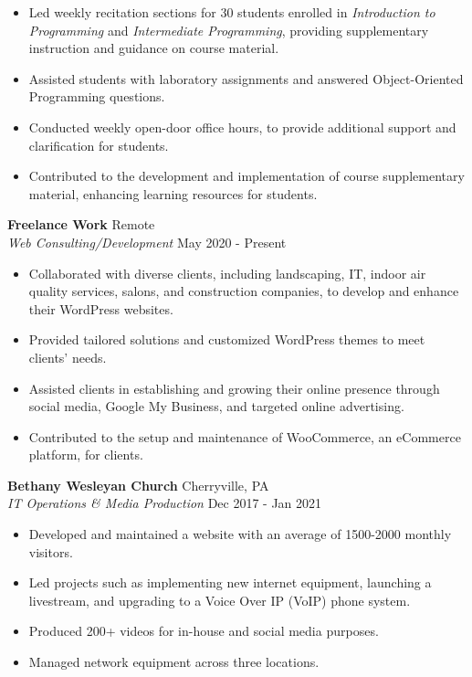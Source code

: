\documentclass[letterpaper]{article}
\begin{document}
\begin{itemize} \itemsep -1pt
	\item Led weekly recitation sections for 30 students enrolled in \textit{Introduction to Programming} and \textit{Intermediate Programming}, providing supplementary instruction and guidance on course material.
	\item Assisted students with laboratory assignments and answered Object-Oriented Programming questions.
	\item Conducted weekly open-door office hours, to provide additional support and clarification for students.
    \item Contributed to the development and implementation of course supplementary material, enhancing learning resources for students.
\end{itemize}
\textbf{Freelance Work} \hfill Remote \\
\textit{Web Consulting/Development} \hfill May 2020 - Present\\
\vspace{-1mm}
\begin{itemize} \itemsep -1pt
	\item Collaborated with diverse clients, including landscaping, IT, indoor air quality services, salons, and construction companies, to develop and enhance their WordPress websites.
	\item Provided tailored solutions and customized WordPress themes to meet clients' needs.
	\item Assisted clients in establishing and growing their online presence through social media, Google My Business, and targeted online advertising.
	\item Contributed to the setup and maintenance of WooCommerce, an eCommerce platform, for clients.
\end{itemize}
\textbf{Bethany Wesleyan Church} \hfill Cherryville, PA\\
\textit{IT Operations \& Media Production} \hfill Dec 2017 - Jan 2021\\
\vspace{-1mm}
\begin{itemize} \itemsep -1pt
	\item Developed and maintained a website with an average of 1500-2000 monthly visitors.
	\item Led projects such as implementing new internet equipment, launching a livestream, and upgrading to a Voice Over IP (VoIP) phone system.
	\item Produced 200+ videos for in-house and social media purposes.
    \item Managed network equipment across three locations.
\end{itemize}
\end{document}
